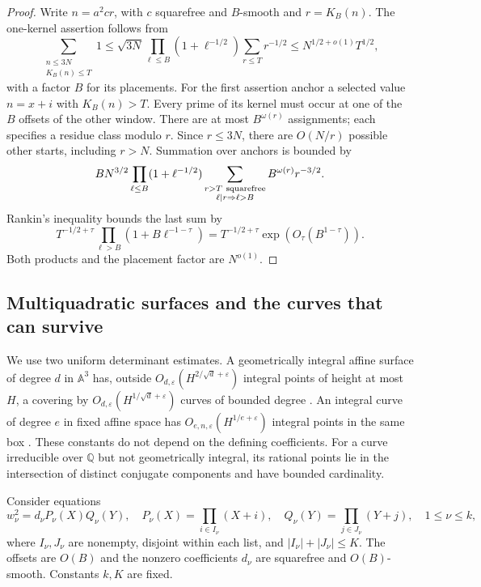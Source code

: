 \begin{proof}
Write $n=a^2cr$, with $c$ squarefree and $B$-smooth and $r=K_B(n)$.
The one-kernel assertion follows from
\[
 \sum_{\substack{n\leq3N\\K_B(n)\leq T}}1
 \leq\sqrt{3N}\prod_{\ell\leq B}(1+\ell^{-1/2})
                       \sum_{r\leq T}r^{-1/2}
 \leq N^{1/2+o(1)}T^{1/2},
\]
with a factor $B$ for its placements.
For the first assertion anchor a selected value $n=x+i$ with $K_B(n)>T$.
Every prime of its kernel must occur at one of the $B$ offsets of the other
window.  There are at most $B^{\omega(r)}$ assignments; each specifies a
residue class modulo $r$.  Since $r\leq3N$, there are $O(N/r)$ possible
other starts, including $r>N$.  Summation over anchors is bounded by
\[
 B N^{3/2}\prod_{\ell\leq B}(1+\ell^{-1/2})
       \sum_{\substack{r>T\ {\rm squarefree}\\\ell\mid r\Rightarrow\ell>B}}
           B^{\omega(r)}r^{-3/2}.
\]
Rankin's inequality bounds the last sum by
\[
 T^{-1/2+\tau}\prod_{\ell>B}(1+B\ell^{-1-\tau})
 =T^{-1/2+\tau}\exp(O_\tau(B^{1-\tau})).
\]
Both products and the placement factor are $N^{o(1)}$.
\end{proof}

\subsection{Multiquadratic surfaces and the curves that can survive}

We use two uniform determinant estimates.  A geometrically integral affine
surface of degree $d$ in $\mathbb A^3$ has, outside
$O_{d,\varepsilon}(H^{2/\sqrt d+\varepsilon})$ integral points of height
at most $H$, a covering by
$O_{d,\varepsilon}(H^{1/\sqrt d+\varepsilon})$ curves of bounded degree
\cite[Lemma~2]{salberger2023}.  An integral curve of degree $e$ in fixed
affine space has $O_{e,n,\varepsilon}(H^{1/e+\varepsilon})$ integral
points in the same box \cite[Theorem~A]{pila1995}.  These constants do
not depend on the defining coefficients.  For a curve irreducible over
$\mathbb Q$ but not geometrically integral, its rational points lie in the
intersection of distinct conjugate components and have bounded cardinality.

Consider equations
\begin{equation}\label{p1:arith:surfaceequations}
 w_\nu^2=d_\nu P_\nu(X)Q_\nu(Y),\quad
 P_\nu(X)=\prod_{i\in I_\nu}(X+i),\quad
 Q_\nu(Y)=\prod_{j\in J_\nu}(Y+j),\quad1\leq\nu\leq k,
\end{equation}
where $I_\nu,J_\nu$ are nonempty, disjoint within each list, and
$|I_\nu|+|J_\nu|\leq K$.  The offsets are $O(B)$ and the nonzero
coefficients $d_\nu$ are squarefree and $O(B)$-smooth.  Constants $k,K$
are fixed.

